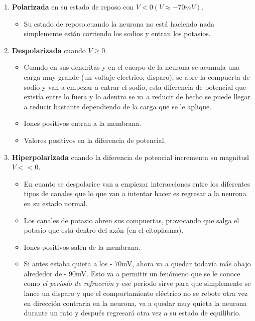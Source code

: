 \begin{enumerate}
 \item \textbf{Polarizada} en su estado de reposo con \(V < 0 ( V \approx -70 mV )\).
 \begin{itemize}
  \item Su estado de reposo,cuando la neurona no está haciendo nada simplemente están corriendo los sodios y entran los potasios.
 \end{itemize}
 \item \textbf{Despolarizada} cuando \(V \geq 0\).
 \begin{itemize}
  \item Cuando en sus dendritas y en el cuerpo de la neurona se acumula una carga muy grande (un voltaje electrico, disparo), se abre la compuerta de sodio y van a empezar a entrar el sodio, esta diferencia de potencial que existía entre lo fuera y lo adentro se va a reducir de hecho se puede llegar a reducir bastante dependiendo de la carga que se le aplique.
  \item Iones positivos entran a la membrana.
  \item Valores positivos en la diferencia de potencial.    
 \end{itemize}
 \item \textbf{Hiperpolarizada} cuando la diferencia de potencial incrementa su magnitud \(V << 0\).
 \begin{itemize}
 \item En cuanto se despolarice van a empiezar interacciones entre los diferentes tipos de canales que lo que van a intentar hacer es regresar a la neurona en su estado normal.
 \item Los canales de potasio abren sus compuertas, provocando que salga el potasio que está dentro del axón (en el citoplasma). 
 \item Iones positivos salen de la membrana.
 \item Si antes estaba quieta a los - 70mV, ahora va a quedar todavía más abajo alrededor de - 90mV. Esto va a permitir un fenómeno que se le conoce como \emph{el periodo de refracción} y ese periodo sirve para que simplemente se lance un disparo y que el comportamiento eléctrico no se rebote otra vez en dirección contraria en la neurona, va a quedar muy quieta la neurona durante un rato y después regresará otra vez a su estado de equilibrio. 
 \end{itemize}

\end{enumerate}
 
